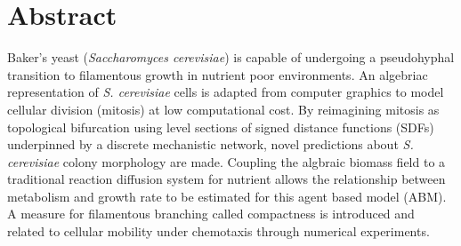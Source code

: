 \chapter{Abstract}
Baker's yeast (\textit{Saccharomyces cerevisiae}) is capable 
of undergoing a pseudohyphal transition to filamentous growth in nutrient poor environments.
An algebriac representation of \textit{S. cerevisiae} cells is adapted from
computer graphics to model cellular division (mitosis) at low computational cost.
By reimagining mitosis as topological bifurcation using level sections 
of signed distance functions (SDFs) underpinned by a discrete mechanistic network, 
novel predictions about 
\textit{S. cerevisiae} colony morphology are made. Coupling 
the algbraic biomass field to a traditional reaction diffusion system 
for nutrient allows the relationship between metabolism 
and growth rate to be estimated for this agent based 
model (ABM). A measure for filamentous branching called compactness 
is introduced and related to cellular mobility under chemotaxis through
numerical experiments.  
